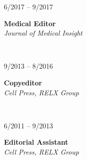 \documentclass{article}
\newcommand\colleft{.20}
\newcommand\colright{.75}
\newcommand{\entryfour}[4]
	{
		\begin{minipage}[t]{\colleft\textwidth}
		\hfill \textsc{#1}
		\end{minipage}
		\hfill\vline\hfill
		\begin{minipage}[t]{\colright\textwidth}
		{\bf#2}\\
		\textit{#3}
		\footnotesize{#4}
		\end{minipage}\\
		\entryvspace
	}%
\newcommand{\entryvspace}{\vspace{0.5em}}
\begin{document}

		\entryfour{6/2017 -- 9/2017}{Medical Editor}{Journal of Medical Insight}{%
		}
		
		\entryfour{9/2013 -- 8/2016}{Copyeditor}{Cell Press, RELX Group}{%
		}
		
		\entryfour{6/2011 -- 9/2013}{Editorial Assistant}{Cell Press, RELX Group}{%
		}

\end{document}
